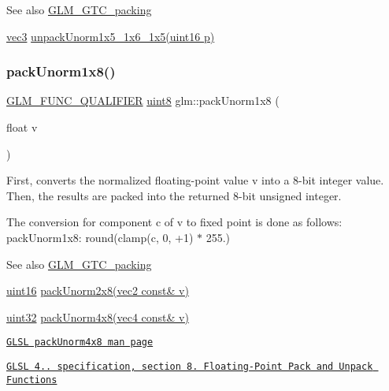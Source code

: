\begin{DoxySeeAlso}{See also}
\hyperlink{group__gtc__packing}{G\+L\+M\+\_\+\+G\+T\+C\+\_\+packing} 

\hyperlink{group__core__types_ga1c47e8b3386109bc992b6c48e91b0be7}{vec3} \hyperlink{group__gtc__packing_ga6804d0525daf68bcac226f46fbb3b24e}{unpack\+Unorm1x5\+\_\+1x6\+\_\+1x5(uint16 p)} 
\end{DoxySeeAlso}
\mbox{\label{group__gtc__packing_ga2f9963e5d762b10085b280d3662017ba}} 
\subsubsection{\texorpdfstring{pack\+Unorm1x8()}{packUnorm1x8()}}
{\footnotesize\ttfamily \hyperlink{setup_8hpp_a33fdea6f91c5f834105f7415e2a64407}{G\+L\+M\+\_\+\+F\+U\+N\+C\+\_\+\+Q\+U\+A\+L\+I\+F\+I\+ER} \hyperlink{group__gtc__type__precision_ga1a7dcd8aac97cc8020817c94049deff2}{uint8} glm\+::pack\+Unorm1x8 (\begin{DoxyParamCaption}\item[{float}]{v }\end{DoxyParamCaption})}

First, converts the normalized floating-\/point value v into a 8-\/bit integer value. Then, the results are packed into the returned 8-\/bit unsigned integer.

The conversion for component c of v to fixed point is done as follows\+: pack\+Unorm1x8\+: round(clamp(c, 0, +1) $\ast$ 255.)

\begin{DoxySeeAlso}{See also}
\hyperlink{group__gtc__packing}{G\+L\+M\+\_\+\+G\+T\+C\+\_\+packing} 

\hyperlink{group__gtc__type__precision_gad8c2939e1fdd8e5828b31d95c52255d5}{uint16} \hyperlink{group__gtc__packing_ga833288fc0d4a79f19d0db75a6843bfe6}{pack\+Unorm2x8(vec2 const\& v)} 

\hyperlink{group__gtc__type__precision_ga202b6a53c105fcb7e531f9b443518451}{uint32} \hyperlink{group__core__func__packing_gaf7d2f7341a9eeb4a436929d6f9ad08f2}{pack\+Unorm4x8(vec4 const\& v)} 

\href{http://www.opengl.org/sdk/docs/manglsl/xhtml/packUnorm4x8.xml}{\tt G\+L\+SL pack\+Unorm4x8 man page} 

\href{http://www.opengl.org/registry/doc/GLSLangSpec.4.20.8.pdf}{\tt G\+L\+SL 4.. specification, section 8. Floating-\/\+Point Pack and Unpack Functions} 
\end{DoxySeeAlso}
\mbox{\label{group__gtc__packing_ga0acca4eb99c300fe2edeef7ebd8fa08b}} 
